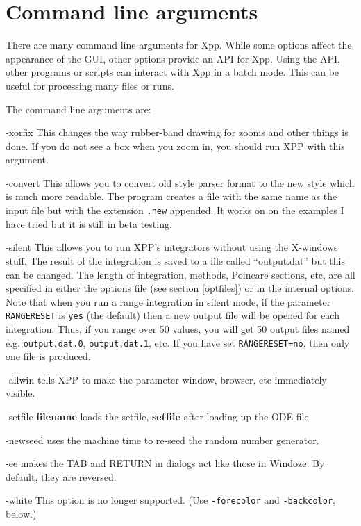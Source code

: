 \section{Command line arguments}
There are many command line arguments for Xpp.  While some options affect the appearance of the GUI, other options provide an API for Xpp.  Using the API, other programs or scripts can interact with Xpp in a batch mode.  This can be useful for processing many files or runs. 

The command line arguments are: 
\begin{description}
\item{-xorfix} This changes the way rubber-band drawing for zooms and
other things is done. If you do not see a box when you zoom in, you
should run XPP with this argument.
\item{-convert}  This allows you to convert old style parser format to
the new style which is much more readable. The program creates a file
with the same name as the input file but with the extension {\tt .new}
appended. It works on on the examples I have tried but it is still in
beta testing.
\item{-silent} This allows you to run XPP's integrators without using
the X-windows stuff.  The result of the integration is saved to a file
called ``output.dat'' but this can be changed. The length of
integration, methods, Poincare sections, etc, are all specified in
either the options file (see section \ref{optfiles})
 or in the internal options. Note that when you run a range integration
in silent mode, if the parameter {\tt RANGERESET} is {\tt yes} (the default) 
then a new output file will be opened for each integration. Thus, if you range 
over 50 values, you will get 50 output files named e.g. {\tt output.dat.0}, 
{\tt output.dat.1}, etc. If you have set {\tt RANGERESET=no}, then only
one file is produced.
\item{-allwin} tells XPP to make the parameter window, browser, etc
immediately visible.
\item{-setfile {\bf filename}} loads the setfile, {\bf setfile} after
loading up the  ODE file.
\item{-newseed} uses the machine time to re-seed the random number
generator. 
\item{-ee} makes the TAB and RETURN in dialogs act like those in
Windoze. By default, they are reversed.  
\item{-white} This option is no longer supported.  (Use {\tt -forecolor} and {\tt -backcolor}, below.)

\end{description}
